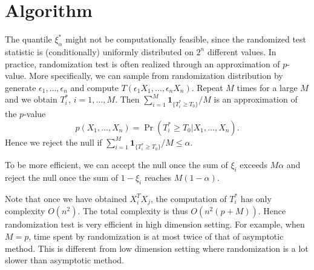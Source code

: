 \documentclass[review]{elsarticle}
\theoremstyle{plain}
\theoremstyle{definition}
\theoremstyle{remark}
\begin{document}
\section{Algorithm}

The quantile $\xi^*_\alpha$ might not be computationally feasible, since the randomized test statistic is (conditionally) uniformly distributed on $2^n$ different values.
In practice, randomization test is often realized through an approximation of $p$-value.
More specifically, we can sample from randomization distribution by generate $\epsilon_1,\ldots,\epsilon_n$ and compute $T(\epsilon_1 X_1,\ldots,\epsilon_n X_n)$.
Repeat $M$ times for a large $M$ and we obtain $T_i^*$, $i=1,\ldots,M$.
Then  $\sum_{i=1}^M \mathbf{1}_{\{T_i^*\geq T_0\}}/M$ is an approximation of the $p$-value 
$$p(X_1,\ldots,X_n)=\Pr(T_i^*\geq T_0|X_1,\ldots,X_n).$$
Hence we reject the null if $\sum_{i=1}^M \mathbf{1}_{\{T_i^*\geq T_0\}}/M\leq \alpha$.

To be more efficient, we can accept the null once the sum of $\xi_i$ exceeds $M\alpha$ and reject the null once the sum of $1-\xi_i$ reaches $M(1-\alpha)$.

Note that once we have obtained $X_i^T X_j$, the computation of $T_i^*$ has only complexity $O(n^2)$.
The total complexity is thus $O(n^2 (p+M))$. Hence randomization test is very efficient in high dimension setting.
For example, when $M=p$, time spent by randomization is at most twice of that of asymptotic method.
This is different from low dimension setting where randomization is a lot slower than asymptotic method.



\end{document}
